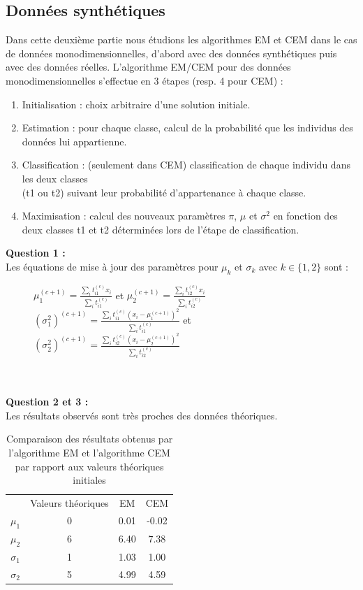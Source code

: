 \documentclass[a4paper, 10pt]{article}
\begin{document}
\subsection*{Données synthétiques}
Dans cette deuxième partie nous étudions les algorithmes EM et CEM dans le cas de données monodimensionnelles,
d'abord avec des données synthétiques puis avec des données réelles.
L'algorithme EM/CEM pour des données monodimensionnelles s'effectue en 3 étapes (resp. 4 pour CEM) :
\begin{enumerate}
\item Initialisation : choix arbitraire d'une solution initiale.
\item Estimation :  pour chaque classe, calcul de la probabilité que les individus des
données lui appartienne.
\item Classification : (seulement dans CEM) classification de chaque individu dans les deux classes \\ (t1 ou t2)
suivant leur probabilité d'appartenance à chaque classe.
\item Maximisation : calcul des nouveaux paramètres $\pi$, $\mu$ et $\sigma^{2}$ en fonction des deux classes t1 et t2 déterminées
lors de l'étape de classification.
\end{enumerate}
\textbf{Question 1 :}\\
Les équations de mise à jour des paramètres pour $\mu_{k}$ et $\sigma_{k}$ avec $k \in \{1,2\}$ sont :
\begin{figure}[h!]
  \centering
$\mu^{(c+1)}_{1} = \frac{ \sum_{i} t_{i1}^{(c)}x_{i} }{ \sum_{i} t_{i1}^{(c)} }$ et
$\mu^{(c+1)}_{2} = \frac{ \sum_{i} t_{i2}^{(c)}x_{i} }{ \sum_{i} t_{i2}^{(c)} }$ \\
$(\sigma^{2}_{1})^{(c+1)} = \frac{ \sum_{i} t_{i1}^{(c)}(x_{i}-\mu^{(c+1)}_{1})^{2}}{ \sum_{i} t_{i1}^{(c)} }$ et
$(\sigma^{2}_{2})^{(c+1)} = \frac{ \sum_{i} t_{i2}^{(c)}(x_{i}-\mu^{(c+1)}_{2})^{2}}{ \sum_{i} t_{i2}^{(c)} }$ 
\end{figure}\\ \\
\textbf{Question 2 et 3 :}\\
Les résultats observés sont très proches des données théoriques.
\begin{table}[h]
\centering
	\begin{tabular}{cccc}
		 & Valeurs théoriques & EM & CEM\\
		$\mu_{1}$ & 0 & 0.01 & -0.02 \\
		$\mu_{2}$ & 6 & 6.40 &  7.38 \\
		$\sigma_{1}$ & 1 & 1.03 & 1.00 \\
		$\sigma_{2}$ & 5 & 4.99 & 4.59 \\
	\end{tabular}
  \caption{Comparaison des résultats obtenus par l'algorithme EM et l'algorithme CEM par rapport aux valeurs théoriques initiales}
\end{table}\\
\end{document}

